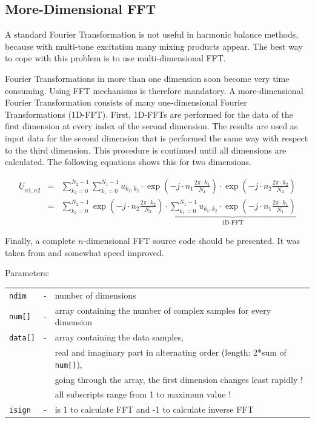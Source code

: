 \subsection{More-Dimensional FFT}

A standard Fourier Transformation is not useful in harmonic balance
methods, because with multi-tone excitation many mixing products appear.
The best way to cope with this problem is to use multi-dimensional
FFT.

\addvspace{12pt}

Fourier Transformations in more than one dimension soon become
very time consuming. Using FFT mechanisms is therefore mandatory.
A more-dimensional Fourier Transformation consists of many
one-dimensional Fourier Transformations (1D-FFT). First, 1D-FFTs
are performed for the data of the first dimension at every index
of the second dimension. The results are used as input data for
the second dimension that is performed the same way with respect
to the third dimension. This procedure is continued until all
dimensions are calculated. The following equations shows this
for two dimensions.

\begin{eqnarray}
\underline{U}_{n1,n2} & = & \sum_{k_2=0}^{N_2-1} \sum_{k_1=0}^{N_1-1}
   u_{k_1,k_2}\cdot \exp\left( -j\cdot n_1\frac{2\pi\cdot k_1}{N_1} \right)
              \cdot \exp\left( -j\cdot n_2\frac{2\pi\cdot k_2}{N_2} \right) \\
 & = & \sum_{k_2=0}^{N_2-1} \exp\left( -j\cdot n_2\frac{2\pi\cdot k_2}{N_2} \right)
       \cdot \underbrace{ \sum_{k_1=0}^{N_1-1}
   u_{k_1,k_2}\cdot \exp\left( -j\cdot n_1\frac{2\pi\cdot k_1}{N_1} \right) }_\text{1D-FFT}
\end{eqnarray}


Finally, a complete $n$-dimensional FFT source code should be
presented. It was taken from \cite{Press} and somewhat speed
improved.

\addvspace{12pt}

Parameters:\\
\begin{tabular}{lcl}
\texttt{ndim}   & - & number of dimensions\\
\texttt{num[]}  & - & array containing the number of complex samples for every dimension\\
\texttt{data[]} & - & array containing the data samples,\\
                &   & real and imaginary part in alternating order (length: 2*sum of \texttt{num[]}),\\
                &   & going through the array, the first dimension changes least rapidly !\\
                &   & all subscripts range from 1 to maximum value !\\
\texttt{isign}  & - & is 1 to calculate FFT and -1 to calculate inverse FFT
\end{tabular}


